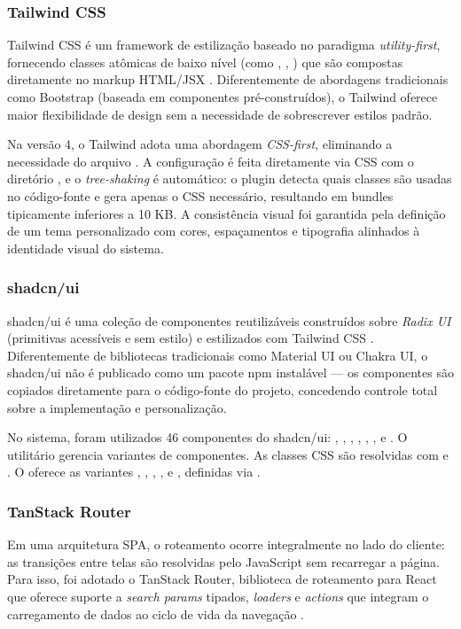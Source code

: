\subsubsection{Tailwind CSS}
Tailwind CSS é um framework de estilização baseado no paradigma \textit{utility-first}, fornecendo classes atômicas de baixo nível (como , , ) que são compostas diretamente no markup HTML/JSX \cite{tailwind2025}. Diferentemente de abordagens tradicionais como Bootstrap (baseada em componentes pré-construídos), o Tailwind oferece maior flexibilidade de design sem a necessidade de sobrescrever estilos padrão.

Na versão 4, o Tailwind adota uma abordagem \textit{CSS-first}, eliminando a necessidade do arquivo . A configuração é feita diretamente via CSS com o diretório , e o \textit{tree-shaking} é automático: o plugin  detecta quais classes são usadas no código-fonte e gera apenas o CSS necessário, resultando em bundles tipicamente inferiores a 10 KB. A consistência visual foi garantida pela definição de um tema personalizado com cores, espaçamentos e tipografia alinhados à identidade visual do sistema.

\subsubsection{shadcn/ui}
shadcn/ui é uma coleção de componentes reutilizáveis construídos sobre \textit{Radix UI} (primitivas acessíveis e sem estilo) e estilizados com Tailwind CSS \cite{shadcn2025}. Diferentemente de bibliotecas tradicionais como Material UI ou Chakra UI, o shadcn/ui não é publicado como um pacote npm instalável --- os componentes são copiados diretamente para o código-fonte do projeto, concedendo controle total sobre a implementação e personalização.

No sistema, foram utilizados 46 componentes do shadcn/ui: , , , , , ,  e . O utilitário  gerencia variantes de componentes. As classes CSS são resolvidas com  e . O  oferece as variantes , , , ,  e , definidas via .

\subsubsection{TanStack Router}
Em uma arquitetura SPA, o roteamento ocorre integralmente no lado do cliente: as transições entre telas são resolvidas pelo JavaScript sem recarregar a página. Para isso, foi adotado o TanStack Router, biblioteca de roteamento para React que oferece suporte a \textit{search params} tipados, \textit{loaders} e \textit{actions} que integram o carregamento de dados ao ciclo de vida da navegação \cite{tanstackrouter2025}.

